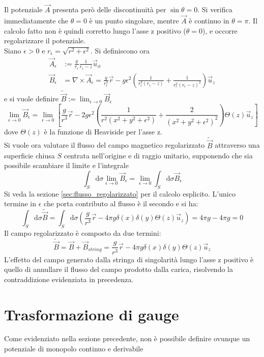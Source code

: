 Il potenziale $\vec A$ presenta però delle discontinuità per $\sin\theta = 0$.
Si verifica immediatamente che $\theta = 0$ è un punto singolare, mentre $\vec A$
è continuo in $\theta = \pi$. Il calcolo fatto non è quindi corretto lungo l'asse z
positivo ($\theta = 0$), e occorre regolarizzare il potenziale.\\
Siano $\epsilon > 0$  e $r_\epsilon = \sqrt{r^2 + \epsilon^2}$. Si definiscono ora
%
\begin{align*}
   \vec A_\epsilon &:= \frac{g}{r_\epsilon}\frac{1}{r_\epsilon - z} \vec u _\phi  \\
   \vec B _\epsilon & = \nabla \times \vec A_\epsilon = \frac{g}{r_\epsilon^3}\vec r
      - g\epsilon^2 \left( \frac{1}{r_\epsilon^3(r_\epsilon - z)}
         + \frac{1}{r_\epsilon^2(r_\epsilon-z)^2} \right)\vec u _z
\end{align*}
%
e si vuole definire $\tilde{\vec B} := \lim_{\epsilon \to 0} \vec B _\epsilon$
$$
   \lim_{\epsilon \to 0} \vec B_\epsilon = \lim_{\epsilon \to 0} \left[
      \frac{g}{r^3}\vec r - 2g\epsilon^2 \left( \frac{1}{r^2(x^2 + y^2 + \epsilon^2)}
            + \frac{2}{(x^2 + y^2 + \epsilon^2)^2} \right) \Theta(z) \vec u _z \right]
$$
dove $\Theta(z)$ è la funzione di Heaviside per l'asse z.\\
Si vuole ora valutare il flusso del campo magnetico regolarizzato $\tilde{\vec B}$
attraverso una superficie chiusa $S$ centrata nell'origine e di raggio unitario, supponendo
che sia possibile scambiare il limite e l'integrale
$$
  \int_S \mathrm{d} \sigma \lim_{\epsilon \to 0} \vec B_\epsilon = \lim_{\epsilon \to 0} \int_S \mathrm{d}\sigma \vec B_\epsilon
$$
Si veda la sezione \ref{sec:flusso_regolarizzato} per il calcolo esplicito.
L'unico termine in $\epsilon$ che porta contributo al flusso è il secondo e si
ha:
$$
   \int_S \mathrm{d}\sigma \tilde{\vec B}
      = \int_S \mathrm{d}\sigma \left( \frac{g}{r^3}\vec r
         - 4\pi g \delta(x)\delta(y)\Theta(z) \vec u _z \right)
      = 4\pi g - 4\pi g = 0
$$
%
Il campo regolarizzato è composto da due termini:
$$
   \tilde{\vec B} = \vec B + \vec B _{string} = \frac{g}{r^3}\vec r
      - 4\pi g \delta(x)\delta(y)\Theta(z) \vec u _z
$$
L'effetto del campo generato dalla stringa di singolarità lungo l'asse z positivo
è quello di annullare il flusso del campo prodotto dalla carica, risolvendo la
contraddizione evidenziata in precedenza.
\section{Trasformazione di gauge}
Come evidenziato nella sezione precedente, non è possibile definire ovunque un
potenziale di monopolo continuo e derivabile
